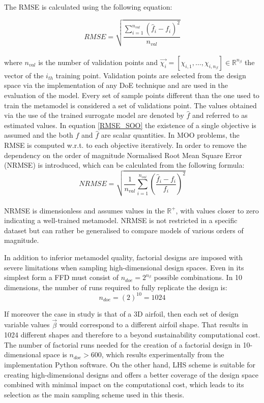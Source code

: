 \newpage


The RMSE is calculated using the following equation:

\begin{equation}\label{RMSE_SOO}
RMSE = \sqrt{ \frac{\sum_{i=1}^{n_{val}} 
\left( \hat{f}_{i} - f_{i} \right)^2 }{n_{val}} }
\end{equation}
\\[0.1cm]
where $n_{val}$ is the number of validation points and   
$\vec{χ_{i}} = \left[ χ_{i,1}, \hdots, χ_{i,n_{β}} \right]
\!\in \!\mathbb{R}^{n_{β}}$ the vector of the $i_{th}$ 
training point. Validation points are selected from the design 
space via the implementation of any DoE technique and are used in 
the evaluation of the model\cite{preprint_SMT}. Every set of 
sample points different than the one used to train the metamodel 
is considered a set of validations point. The values obtained
via the use of the trained surrogate model are denoted by 
$\hat{f}$ and referred to as estimated values. In equation 
\ref{RMSE_SOO} the existence of a single objective is assumed and 
the both $f$ and $\hat{f}$ are scalar quantities. In MOO 
problems, the RMSE is computed w.r.t. to each objective 
iteratively. In order to remove the dependency on the order of 
magnitude Normalised Root Mean Square Error (NRMSE) is 
introduced, which can be calculated from the following formula:
\begin{equation}
NRMSE = \sqrt{ \dfrac{1}{n_{val}}\sum_{i=1}^{n_{val}} \left( 
\frac{ \hat{f}_{i} - f_{i}  }{f_{i}} \right)^2 }
\end{equation}
\\
NRMSE is dimensionless and assumes values in the $\mathbb{R}^{+}$, 
with values closer to zero indicating a well-trained metamodel.
NRMSE is not restricted in a specific dataset but can rather be
generalised to compare models of various orders of magnitude. 

In addition to inferior metamodel quality, factorial designs are 
imposed with severe limitations when sampling high-dimensional 
design spaces. Even in its simplest form a FFD must consist of 
$n_{doe} = 2^{n_{β}}$ possible combinations. In 10 dimensions, 
the number of runs required to fully replicate the design is:
$$ n_{doe} = (2)^{10} = 1024 $$ 

If moreover the case in study is that of a 3D airfoil, then 
each set of design variable values $\vec{β}$ would correspond 
to a different airfoil shape. That results in 1024 
different shapes and therefore to a beyond sustainability 
computational cost. The number of factorial runs needed for the
creation of a factorial design in 10-dimensional space is $n_{doe} 
> 600$, which results experimentally from the implementation Python 
software. On the other hand, LHS scheme is suitable for creating 
high-dimensional designs and offers a better coverage of the design 
space combined with minimal impact on the computational cost, which 
leads to its selection as the main sampling scheme used in this 
thesis. 
   
